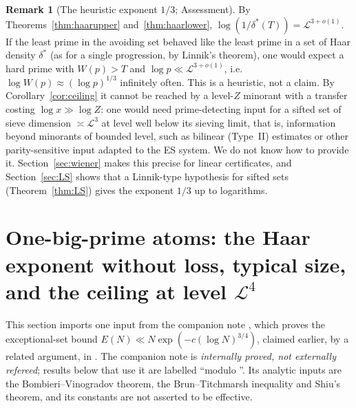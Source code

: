 \documentclass[11pt,reqno]{amsart}
\theoremstyle{definition}
\newtheorem{remark}[theorem]{Remark}
\newcommand{\Lc}{\mathcal L}
\begin{document}
\begin{remark}[The heuristic exponent $1/3$; Assessment]\label{rem:third}
By Theorems~\ref{thm:haarupper} and~\ref{thm:haarlower},
$\log(1/\delta^*(T))=\Lc^{3+o(1)}$.  If the least prime in the avoiding set
behaved like the least prime in a set of Haar density $\delta^*$ (as for a
single progression, by Linnik's theorem), one would expect a hard prime with
$W(p)>T$ and $\log p\ll\Lc^{3+o(1)}$, i.e.\ $\log W(p)\approx(\log p)^{1/3}$
infinitely often.  This is a heuristic, not a claim.  By
Corollary~\ref{cor:ceiling} it cannot be reached by a level-$Z$ minorant
with a transfer costing $\log x\gg\log Z$: one would need prime-detecting
input for a sifted set of sieve dimension $\asymp\Lc^3$ at level well below
its sieving limit, that is, information beyond minorants of bounded level,
such as bilinear (Type~II) estimates or other parity-sensitive input
adapted to the ES system.  We do not know how to provide it.
Section~\ref{sec:wiener} makes this precise for linear certificates, and
Section~\ref{sec:LS} shows that a Linnik-type hypothesis for sifted sets
(Theorem~\ref{thm:LS}) gives the exponent $1/3$ up to logarithms.
\end{remark}

\section{One-big-prime atoms: the Haar exponent without loss, typical size, and the ceiling at level \texorpdfstring{$\Lc^4$}{L\textasciicircum 4}}\label{sec:atoms34}

This section imports one input from the companion note \cite{TQ}, which
proves the exceptional-set bound $E(N)\ll N\exp(-c(\log N)^{3/4})$, claimed
earlier, by a related argument, in \cite{KRK}.  The companion note \cite{TQ} is
\emph{internally proved, not externally refereed}; results below that use it
are labelled ``modulo \cite{TQ}''.  Its analytic inputs are the
Bombieri--Vinogradov theorem, the Brun--Titchmarsh inequality and Shiu's
theorem, and its constants are not asserted to be effective.
\end{document}
